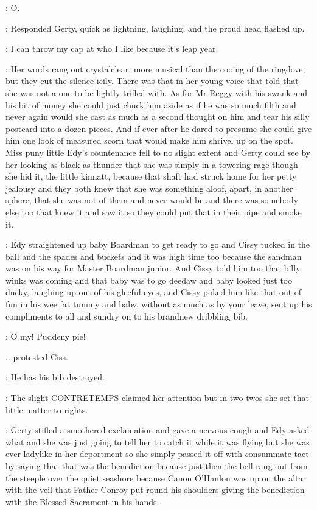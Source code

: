 \gerty:
O.

:
Responded Gerty, quick as lightning, laughing, and the proud head
flashed up.

\gerty:
I can throw my cap at who I like because it's leap year.

:
Her words rang out crystalclear, more musical than the cooing of the
ringdove, but they cut the silence icily. There was that in her young
voice that told that she was not a one to be lightly trifled with.
As for Mr Reggy with his swank and his bit of money she could just
chuck him aside as if he was so much filth and never again would she
cast as much as a second thought on him and tear his silly postcard
into a dozen pieces. And if ever after he dared to presume she
could give him one look of measured scorn that would make him
shrivel up on the spot. Miss puny little Edy's countenance fell to
no slight extent and Gerty could see by her looking as black as
thunder that she was simply in a towering rage though she hid it, the
little kinnatt, because that shaft had struck home for her petty jealousy
and they both knew that she was something aloof, apart, in another sphere,
that she was not of them and never would be and there was somebody else
too that knew it and saw it so they could put that in their pipe
and smoke it.

:
Edy straightened up baby Boardman to get ready to go and Cissy
tucked in the ball and the spades and buckets and it was high time too
because the sandman was on his way for Master Boardman junior. And
Cissy told him too that billy winks was coming and that baby was to go
deedaw and baby looked just too ducky, laughing up out of his gleeful
eyes, and Cissy poked him like that out of fun in his wee fat tummy and
baby, without as much as by your leave, sent up his compliments to all
and sundry on to his brandnew dribbling bib.

\cissy:
O my! Puddeny pie!

.. protested Ciss.

\cissy:
He has his bib destroyed.

:
The slight CONTRETEMPS claimed her attention but in two twos she set
that little matter to rights.

:
Gerty stifled a smothered exclamation and gave a nervous cough and
Edy asked what and she was just going to tell her to catch it while it was
flying but she was ever ladylike in her deportment so she simply passed it
off with consummate tact by saying that that was the benediction because
just then the bell rang out from the steeple over the quiet seashore
because Canon O'Hanlon was up on the altar with the veil that Father
Conroy put round his shoulders giving the benediction with the Blessed
Sacrament in his hands.

